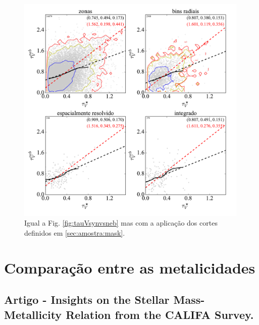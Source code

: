 \begin{figure}
	\centering
	\includegraphics[width=0.99\textwidth]{figuras/CompareTauV_realsample.pdf}
	\caption[Comparação entre os coeficientes de extinção (com máscara).]
	{Igual a Fig. \ref{fig:tauVsynvsneb} mas com a aplicação dos cortes definidos em
\ref{sec:amostra:mask}.} 
	\label{fig:tauVsynvsnebMask}
\end{figure}


\section{Comparação entre as metalicidades}
\label{sec:synvsneb:Z}

\subsection{Artigo - Insights on the Stellar Mass-Metallicity Relation from the CALIFA Survey.}

